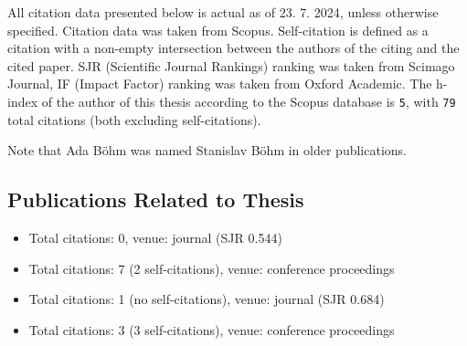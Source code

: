 All citation data presented below is actual as of 23. 7. 2024, unless otherwise
            specified. Citation data was taken from Scopus.
Self-citation is defined as a citation with a non-empty intersection between the authors of the citing and the cited paper.
SJR (Scientific Journal Rankings) ranking was taken from Scimago Journal,
IF (Impact Factor) ranking was taken from Oxford Academic.
The h-index of the author of this thesis according to the Scopus database is \texttt{5},
with \texttt{79} total citations (both excluding self-citations).

Note that Ada Böhm was named Stanislav Böhm in older publications.

\begin{refsection}
\section*{Publications Related to Thesis}
	\begin{itemize}
		\item{}\par{}Total citations: 0, venue: journal (SJR 0.544)
		\item{}\par{}Total citations: 7 (2 self-citations), venue: conference proceedings
		\item{}\par{}Total citations: 1 (no self-citations), venue: journal (SJR 0.684)
		\item{}\par{}Total citations: 3 (3 self-citations), venue: conference proceedings
	\end{itemize}


\end{refsection}
